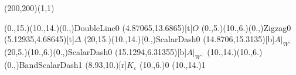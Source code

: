 \unitlength=1bp%

\begin{feynartspicture}(200,200)(1,1)

\FADiagram{}
\FAProp(0.,15.)(10.,14.)(0.,){DoubleLine}{0}
\FALabel(4.87065,13.6865)[t]{$O$}
\FAProp(0.,5.)(10.,6.)(0.,){Zigzag}{0}
\FALabel(5.12935,4.68645)[t]{$\Delta$}
\FAProp(20,15.)(10.,14.)(0.,){ScalarDash}{0}
\FALabel(14.8706,15.3135)[b]{$A|_{W^\perp}$}
\FAProp(20,5.)(10.,6.)(0.,){ScalarDash}{0}
\FALabel(15.1294,6.31355)[b]{$A|_{W^\perp}$}
\FAProp(10.,14.)(10.,6.)(0.,){BandScalarDash}{1}
\FALabel(8.93,10.)[r]{$K_\varepsilon$}
\FAVert(10.,6.){0}
\FAVert(10.,14.){1}
\end{feynartspicture}

